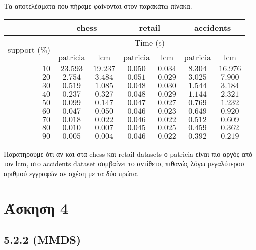 \documentclass[a4paper,11pt]{article}
\begin{document}
Τα αποτελέσματα που πήραμε φαίνονται στον παρακάτω πίνακα.
\begin{center}
	\begin{tabular}{| r | c | c || c | c || c | c |}
		\hline
		& \multicolumn{2}{c}{chess} & \multicolumn{2}{|c|}{retail} & \multicolumn{2}{|c|}{accidents} \\ \hline
		\multirow{2}{*}{support (\%)} & \multicolumn{6}{|c|}{Time (s)} \\
		& patricia & lcm & patricia & lcm & patricia & lcm \\ \hhline{|=|=|=#=|=#=|=|}
		$10$ & $23.593$ & $19.237$ & $0.050$ & $0.034$ & $8.304$ & $16.976$ \\ \hline
		$20$ & $2.754$ & $3.484$ & $0.051$ & $0.029$ & $3.025$ & $7.900$ \\ \hline
		$30$ & $0.519$ & $1.085$ & $0.048$ & $0.030$ & $1.544$ & $3.184$ \\ \hline
		$40$ & $0.237$ & $0.327$ & $0.048$ & $0.029$ & $1.144$ & $2.321$ \\ \hline
		$50$ & $0.099$ & $0.147$ & $0.047$ & $0.027$ & $0.769$ & $1.232$ \\ \hline
		$60$ & $0.047$ & $0.050$ & $0.046$ & $0.023$ & $0.649$ & $0.920$ \\ \hline
		$70$ & $0.018$ & $0.022$ & $0.046$ & $0.022$ & $0.512$ & $0.609$ \\ \hline
		$80$ & $0.010$ & $0.007$ & $0.045$ & $0.025$ & $0.459$ & $0.362$ \\ \hline
		$90$ & $0.005$ & $0.004$ & $0.046$ & $0.022$ & $0.392$ & $0.219$ \\ \hline
	\end{tabular}
\end{center}
Παρατηρούμε ότι αν και στα chess και retail datasets ο patricia είναι πιο αργός από τον lcm, στο accidents dataset συμβαίνει το αντίθετο, πιθανώς λόγω μεγαλύτερου αριθμού εγγραφών σε σχέση με τα δύο πρώτα.

\section*{Άσκηση 4}

\subsection*{5.2.2 (MMDS)}
\end{document}
